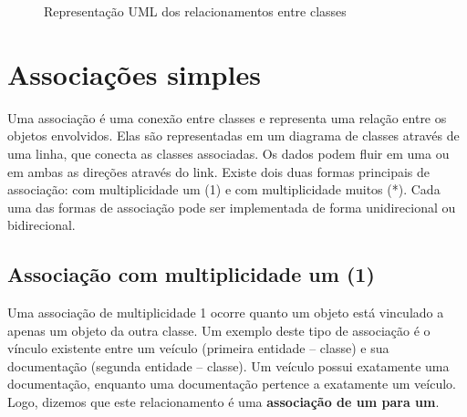 \begin{figure}[h]
	\centering
	\caption{Representação UML dos relacionamentos entre classes}
	\label{fig:relacionamentos-uml}
\end{figure}


\section{Associações simples}

Uma associação é uma conexão entre classes e representa uma relação entre os objetos envolvidos. Elas são representadas em um diagrama de classes através de uma linha, que conecta as classes associadas. Os dados podem fluir em uma ou em ambas as direções através do link. Existe dois duas formas principais de associação: com multiplicidade um (1) e com multiplicidade muitos (*). Cada uma das formas de associação pode ser implementada de forma unidirecional ou bidirecional.


\subsection{Associação com multiplicidade um (1)}

Uma associação de multiplicidade 1 ocorre quanto um objeto está vinculado a apenas um objeto da outra classe. Um exemplo deste tipo de associação é o vínculo existente entre um veículo (primeira entidade -- classe) e sua documentação (segunda entidade -- classe). Um veículo possui exatamente uma documentação, enquanto uma documentação pertence a exatamente um veículo. Logo, dizemos que este relacionamento é uma \textbf{associação de um para um}.

